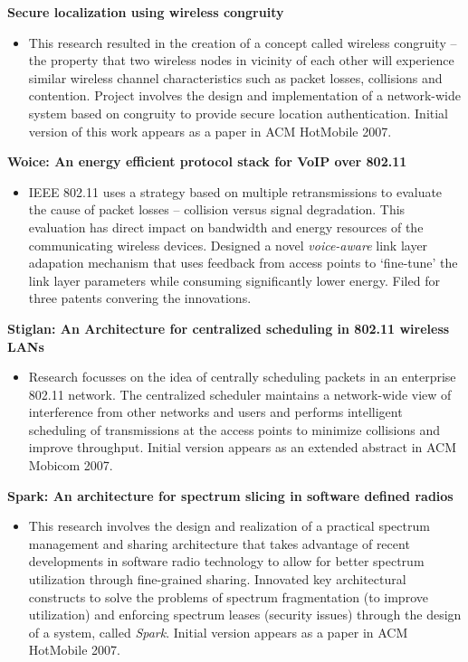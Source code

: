 \begin{resume}
\vspace{-0.2cm}

{\bf Secure localization using wireless congruity}
    \begin{itemize}
	\item [] This research resulted in the creation of a concept called
	wireless congruity -- the property that two wireless nodes in vicinity of each other will
experience similar wireless channel characteristics such as packet losses, collisions and contention. Project involves the design
and implementation of a network-wide system based on congruity to provide secure location authentication. Initial
version of this work appears as a paper in ACM HotMobile 2007.
    \end{itemize}
\vspace{-0.2cm}

{\bf Woice: An energy efficient protocol stack for VoIP over 802.11}
    \begin{itemize}
	\item [] IEEE 802.11 uses a strategy based on multiple retransmissions  to evaluate the cause of packet losses
-- collision versus signal degradation. This evaluation has direct impact on
bandwidth and energy resources of the communicating wireless devices. Designed
a novel {\it voice-aware} link layer
adapation mechanism that uses feedback from access points to `fine-tune' the
link layer parameters while consuming significantly
lower energy.  Filed for three patents convering the innovations.
\end{itemize}
\vspace{-0.2cm}

{\bf Stiglan: An Architecture for centralized scheduling in 802.11 wireless LANs}
    \begin{itemize}
	\item [] Research focusses on the idea of centrally scheduling packets
	in an enterprise 802.11 network. The centralized scheduler maintains a
	network-wide view of interference from other networks and users and
	performs intelligent scheduling of transmissions at the access points
	to minimize collisions and improve throughput. Initial version appears
	as an extended abstract in ACM Mobicom 2007.
    \end{itemize}
\vspace{-0.2cm}

{\bf Spark: An architecture for spectrum slicing in software defined radios}
 \begin{itemize}
 \item [] This research
involves the design and realization of a practical spectrum management and sharing architecture that takes advantage of
recent developments in software radio technology to allow for better spectrum utilization through fine-grained sharing.
Innovated key architectural constructs to solve the problems of spectrum fragmentation (to improve utilization) and
enforcing spectrum leases (security issues) through the design of a system, called {\it Spark}. Initial version appears
as a paper in ACM HotMobile 2007.
 \end{itemize}



\end{resume}
